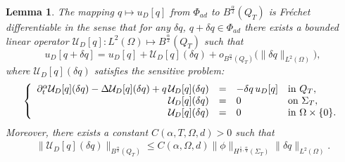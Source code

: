 \documentclass[a4paper,12pt,reqno,natbib]{amsart}
\newtheorem{lemma}[theorem]{Lemma}
\begin{document}
\begin{lemma} \label{taylor_d}
The mapping $q\longmapsto u_D[q]$ from $\Phi_{ad}$ to $B^{\frac{\alpha}{2}}(Q_T)$ is Fr\'echet
differentiable in the sense that for any $\delta q$, $q+\delta q \in \Phi_{ad}$  there exists a bounded linear operator $\mathcal{U}_D[q]: L^2(\Omega) \mapsto B^{\frac{\alpha}{2}}(Q_T) $ such that
\begin{equation*}
    u_D [q+\delta q]=u_D [q]+\mathcal{U}_{D}[q] (\delta q)+o_{B^{\frac{\alpha}{2}}(Q_T)}\Big(\|\delta q\|_{L^2(\Omega)}\Big),
\end{equation*}
where $\mathcal{U}_{D}[q] (\delta q)$ satisfies the sensitive problem:
\begin{eqnarray} \label{P_d++}
\left\{ 
  \begin{array}{rcll}
    \partial_{t} ^{\alpha} \mathcal{U}_{D}[q] (\delta q)-\Delta \mathcal{U}_{D}[q] (\delta q) +q\, \mathcal{U}_{D} [q](\delta q)&=& -\delta q \,u_D [q] &\hbox{in}\ Q_T, \\
    \mathcal{U}_{D}[q] (\delta q) &=&0 &\hbox{on}\  \Sigma_T, \\
    \displaystyle \mathcal{U}_{D}[q] (\delta q)&=&0  &\hbox{in}\ \Omega\times\{0\}.
  \end{array}
\right.
\end{eqnarray}
Moreover, there exists a constant $C(\alpha,T,\Omega,d)>0$ such that
\begin{align*} %
    \|\mathcal{U}_{D}[q] (\delta q)\|_{B^{\frac{\alpha}{2}}(Q_T)} \leq C(\alpha,\Omega,d)\|\phi\|_{H^{\frac{1}{2}, \frac{\alpha}{4} }(\Sigma_T)}\|\delta q\|_{L^2(\Omega)}.
\end{align*}
\end{lemma}
\end{document}
